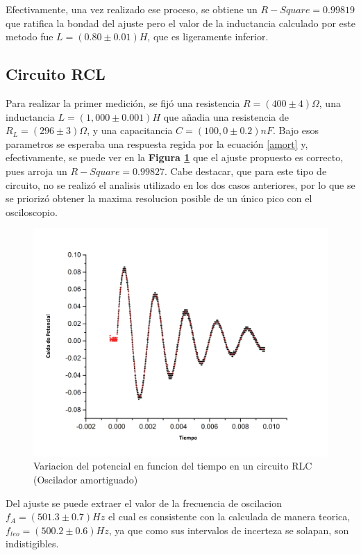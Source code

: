 \documentclass[11pt,a4paper]{article}
\begin{document}
Efectivamente, una vez realizado ese proceso, se obtiene un $R-Square = 0.99819$ que ratifica la bondad del ajuste pero el valor de la inductancia calculado por este metodo fue $L = (0.80 \pm 0.01) H$, que es ligeramente inferior. 


\subsection{Circuito RCL}

Para realizar la primer medición, se fijó una resistencia $R= (400 \pm 4) \Omega$, una inductancia $L = (1,000 \pm 0.001) H$ que añadia una resistencia de $R_{L} = (296 \pm 3) \Omega$, y una capacitancia $C = (100,0 \pm 0.2) nF$. Bajo esos parametros se esperaba una respuesta regida por la ecuación \eqref{amort} y, efectivamente, se puede ver en la \textbf{Figura \ref{fig:RLC-A}} que el ajuste propuesto es correcto, pues arroja un $R-Square = 0.99827$. Cabe destacar, que para este tipo de circuito, no se realizó el analisis utilizado en los dos casos anteriores, por lo que se se priorizó obtener la maxima resolucion posible de un único pico con el osciloscopio.

\begin{figure}[H]
\centering
\includegraphics[scale=0.4]{RLC-Amortiguado(1H)}
  \caption{Variacion del potencial en funcion del tiempo en un circuito RLC (Oscilador amortiguado)}
  \label{fig:RLC-A}
\end{figure}

Del ajuste se puede extraer el valor de la frecuencia de oscilacion $f_{A} = (501.3 \pm 0.7) Hz$ el cual es consistente con la calculada de manera teorica, $f_{teo} = (500.2 \pm 0.6)Hz$, ya que como sus intervalos de incerteza se solapan, son indistigibles.
\end{document}
